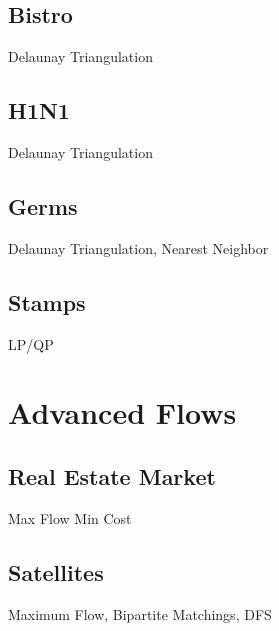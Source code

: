 \documentclass[10pt,a4paper,twoside]{report}
\begin{document}
\newpage
\subsection*{Bistro}
\begin{keywords}Delaunay Triangulation\end{keywords}


\newpage
\subsection*{H1N1}
\begin{keywords}Delaunay Triangulation\end{keywords}


\newpage
\subsection*{Germs}
\begin{keywords}Delaunay Triangulation, Nearest Neighbor\end{keywords}


\newpage
\subsection*{Stamps}
\begin{keywords}LP/QP\end{keywords}



\newpage
\section{Advanced Flows}

\subsection*{Real Estate Market}
\begin{keywords}Max Flow Min Cost\end{keywords}


\newpage
\subsection*{Satellites}
\begin{keywords}Maximum Flow, Bipartite Matchings, DFS\end{keywords}

\end{document}

